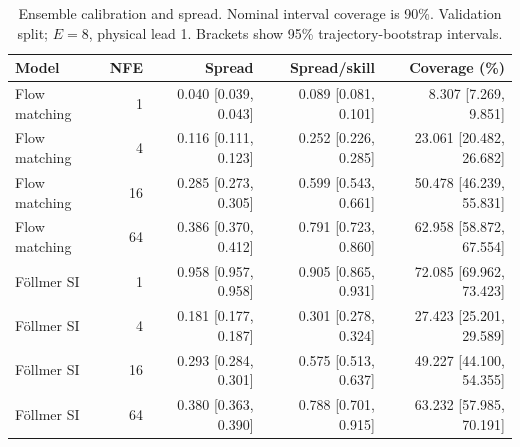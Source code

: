 \begin{table}[t]
\centering
\small
\setlength{\tabcolsep}{3pt}
\caption{Ensemble calibration and spread. Nominal interval coverage is 90\%. Validation split; $E=8$, physical lead 1. Brackets show 95\% trajectory-bootstrap intervals.}
\label{tab:map-calibration}
\begin{tabular}{lrrrr}
\toprule
Model & NFE & Spread & Spread/skill & Coverage (\%) \\
\midrule
Flow matching & 1 & 0.040 [0.039, 0.043] & 0.089 [0.081, 0.101] & 8.307 [7.269, 9.851] \\
Flow matching & 4 & 0.116 [0.111, 0.123] & 0.252 [0.226, 0.285] & 23.061 [20.482, 26.682] \\
Flow matching & 16 & 0.285 [0.273, 0.305] & 0.599 [0.543, 0.661] & 50.478 [46.239, 55.831] \\
Flow matching & 64 & 0.386 [0.370, 0.412] & 0.791 [0.723, 0.860] & 62.958 [58.872, 67.554] \\
\addlinespace
Föllmer SI & 1 & 0.958 [0.957, 0.958] & 0.905 [0.865, 0.931] & 72.085 [69.962, 73.423] \\
Föllmer SI & 4 & 0.181 [0.177, 0.187] & 0.301 [0.278, 0.324] & 27.423 [25.201, 29.589] \\
Föllmer SI & 16 & 0.293 [0.284, 0.301] & 0.575 [0.513, 0.637] & 49.227 [44.100, 54.355] \\
Föllmer SI & 64 & 0.380 [0.363, 0.390] & 0.788 [0.701, 0.915] & 63.232 [57.985, 70.191] \\
\bottomrule
\end{tabular}
\end{table}
